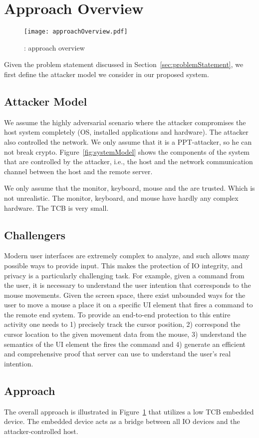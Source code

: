 \section{Approach Overview}
\label{sec:approach}



\begin{figure}[t]
\centering
\texttt{[image: approachOverview.pdf]}
\caption{\name: approach overview}
\label{fig:approachOverview}
\centering
\end{figure}

Given the problem statement discussed in Section~\ref{sec:problemStatement}, we first define the attacker model we consider in our proposed system.


\subsection{Attacker Model}

We assume the highly adversarial scenario where the attacker compromises the host system completely (OS, installed applications and hardware). The attacker also controlled the network. We only assume that it is a PPT-attacker, so he can not break crypto. Figure~\ref{fig:systemModel} shows the components of the system that are controlled by the attacker, i.e., the host and the network communication channel between the host and the remote server.

We only assume that the monitor, keyboard, mouse and the \device are trusted. Which is not unrealistic. The monitor, keyboard, and mouse have hardly any complex hardware. The TCB is very small.

\subsection{Challengers}

Modern user interfaces are extremely complex to analyze, and such allows many possible ways to provide input. This makes the protection of IO integrity, and privacy is a particularly challenging task. For example, given a command from the user, it is necessary to understand the user intention that corresponds to the mouse movements. Given the screen space, there exist unbounded ways for the user to move a mouse a place it on a specific UI element that fires a command to the remote end system. To provide an end-to-end protection to this entire activity one needs to 1) precisely track the cursor position, 2) correspond the cursor location to the given movement data from the mouse, 3) understand the semantics of the UI element the fires the command and 4) generate an efficient and comprehensive proof that server can use to understand the user's real intention.  


\subsection{Approach}

The overall approach is illustrated in Figure~\ref{fig:approachOverview} that utilizes a low TCB embedded device. The embedded device acts as a bridge between all IO devices and the attacker-controlled host.
